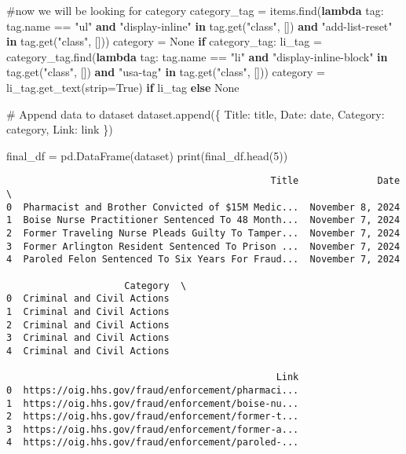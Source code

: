 \documentclass[
  letterpaper,
  DIV=11,
  numbers=noendperiod]{scrartcl}
\newenvironment{Shaded}{\begin{snugshade}}{\end{snugshade}}
\newcommand{\BuiltInTok}[1]{\textcolor[rgb]{0.00,0.23,0.31}{#1}}
\newcommand{\CommentTok}[1]{\textcolor[rgb]{0.37,0.37,0.37}{#1}}
\newcommand{\ControlFlowTok}[1]{\textcolor[rgb]{0.00,0.23,0.31}{\textbf{#1}}}
\newcommand{\DecValTok}[1]{\textcolor[rgb]{0.68,0.00,0.00}{#1}}
\newcommand{\KeywordTok}[1]{\textcolor[rgb]{0.00,0.23,0.31}{\textbf{#1}}}
\newcommand{\NormalTok}[1]{\textcolor[rgb]{0.00,0.23,0.31}{#1}}
\newcommand{\OperatorTok}[1]{\textcolor[rgb]{0.37,0.37,0.37}{#1}}
\newcommand{\StringTok}[1]{\textcolor[rgb]{0.13,0.47,0.30}{#1}}
\newcommand{\VariableTok}[1]{\textcolor[rgb]{0.07,0.07,0.07}{#1}}
\begin{document}
\begin{Shaded}
\begin{Highlighting}[]
    \CommentTok{\#now we will be looking for category}
\NormalTok{    category\_tag }\OperatorTok{=}\NormalTok{ items.find(}\KeywordTok{lambda}\NormalTok{ tag: tag.name }\OperatorTok{==} \StringTok{"ul"} \KeywordTok{and} \StringTok{"display{-}inline"} \KeywordTok{in}\NormalTok{ tag.get(}\StringTok{"class"}\NormalTok{, []) }\KeywordTok{and} \StringTok{"add{-}list{-}reset"} \KeywordTok{in}\NormalTok{ tag.get(}\StringTok{"class"}\NormalTok{, []))}
\NormalTok{    category }\OperatorTok{=} \VariableTok{None}
    \ControlFlowTok{if}\NormalTok{ category\_tag:}
\NormalTok{        li\_tag }\OperatorTok{=}\NormalTok{ category\_tag.find(}\KeywordTok{lambda}\NormalTok{ tag: tag.name }\OperatorTok{==} \StringTok{"li"} \KeywordTok{and} \StringTok{"display{-}inline{-}block"} \KeywordTok{in}\NormalTok{ tag.get(}\StringTok{"class"}\NormalTok{, []) }\KeywordTok{and} \StringTok{"usa{-}tag"} \KeywordTok{in}\NormalTok{ tag.get(}\StringTok{"class"}\NormalTok{, []))}
\NormalTok{        category }\OperatorTok{=}\NormalTok{ li\_tag.get\_text(strip}\OperatorTok{=}\VariableTok{True}\NormalTok{) }\ControlFlowTok{if}\NormalTok{ li\_tag }\ControlFlowTok{else} \VariableTok{None}

    \CommentTok{\# Append data to dataset}
\NormalTok{    dataset.append(\{}
        \StringTok{\textquotesingle{}Title\textquotesingle{}}\NormalTok{: title, }
        \StringTok{\textquotesingle{}Date\textquotesingle{}}\NormalTok{: date, }
        \StringTok{\textquotesingle{}Category\textquotesingle{}}\NormalTok{: category, }
        \StringTok{\textquotesingle{}Link\textquotesingle{}}\NormalTok{: link }
\NormalTok{    \})}

\NormalTok{final\_df }\OperatorTok{=}\NormalTok{ pd.DataFrame(dataset)}
\BuiltInTok{print}\NormalTok{(final\_df.head(}\DecValTok{5}\NormalTok{))}
\end{Highlighting}
\end{Shaded}

\begin{verbatim}
                                               Title              Date  \
0  Pharmacist and Brother Convicted of $15M Medic...  November 8, 2024   
1  Boise Nurse Practitioner Sentenced To 48 Month...  November 7, 2024   
2  Former Traveling Nurse Pleads Guilty To Tamper...  November 7, 2024   
3  Former Arlington Resident Sentenced To Prison ...  November 7, 2024   
4  Paroled Felon Sentenced To Six Years For Fraud...  November 7, 2024   

                     Category  \
0  Criminal and Civil Actions   
1  Criminal and Civil Actions   
2  Criminal and Civil Actions   
3  Criminal and Civil Actions   
4  Criminal and Civil Actions   

                                                Link  
0  https://oig.hhs.gov/fraud/enforcement/pharmaci...  
1  https://oig.hhs.gov/fraud/enforcement/boise-nu...  
2  https://oig.hhs.gov/fraud/enforcement/former-t...  
3  https://oig.hhs.gov/fraud/enforcement/former-a...  
4  https://oig.hhs.gov/fraud/enforcement/paroled-...  
\end{verbatim}
\end{document}

